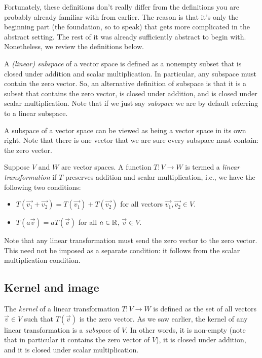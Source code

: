 \documentclass[10pt]{amsart}
\begin{document}
Fortunately, these definitions don't really differ from the
definitions you are probably already familiar with from earlier. The
reason is that it's only the beginning part (the foundation, so to
speak) that gets more complicated in the abstract setting. The rest of
it was already sufficiently abstract to begin with. Nonetheless, we
review the definitions below.
 
A {\em (linear) subspace} of a vector space is defined as a nonempty
subset that is closed under addition and scalar multiplication. In
particular, any subspace must contain the zero vector. So, an
alternative definition of subspace is that it is a subset that
contains the zero vector, is closed under addition, and is closed
under scalar multiplication. Note that if we just say {\em subspace}
we are by default referring to a linear subspace.

A subspace of a vector space can be viewed as being a vector space in
its own right. Note that there is one vector that we are sure every
subspace must contain: the zero vector.
  
Suppose $V$ and $W$ are vector spaces. A function $T: V \to W$ is
termed a {\em linear transformation} if $T$ preserves addition and
scalar multiplication, i.e., we have the following two conditions:

\begin{itemize}
\item $T(\vec{v_1} + \vec{v_2}) = T(\vec{v_1}) + T(\vec{v_2})$ for
  all vectors $\vec{v_1},\vec{v_2} \in V$.
\item $T(a\vec{v}) = aT(\vec{v})$ for all $a \in \mathbb{R}$, $\vec{v} \in
    V$.
\end{itemize}

Note that any linear transformation must send the zero vector to the
zero vector. This need not be imposed as a separate condition: it
follows from the scalar multiplication condition.

\subsection{Kernel and image}

The {\em kernel} of a linear transformation $T: V \to W$ is defined as
the set of all vectors $\vec{v} \in V$ such that $T(\vec{v})$ is the
zero vector. As we saw earlier, the kernel of any linear
transformation is a {\em subspace} of $V$. In other words, it is
non-empty (note that in particular it contains the zero vector of
$V$), it is closed under addition, and it is closed under scalar
multiplication.
\end{document}
